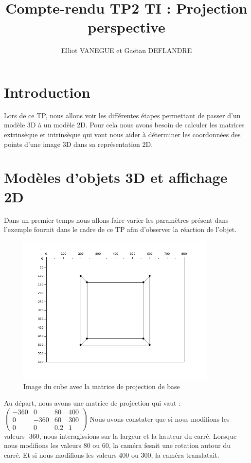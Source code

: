 \documentclass[a4paper,11pt]{article}
\title{Compte-rendu TP2 TI : Projection perspective}
\author{Elliot VANEGUE et Gaëtan DEFLANDRE}
\begin{document}


  \maketitle
  
  \mbox{}
  \newpage
  \clearpage
  
  \section*{Introduction}
  Lors de ce TP, nous allons voir les différentes étapes permettant de passer d'un
  modèle 3D à un modèle 2D. Pour cela nous avons besoin de calculer les matrices 
  extrinsèque et intrinsèque qui vont nous aider à déterminer les coordonnées des points
  d'une image 3D dans sa représentation 2D.
  
  \section{Modèles d'objets 3D et affichage 2D}
  Dans un premier temps nous allons faire varier les paramètres présent dans l'exemple fournit
  dans le cadre de ce TP afin d'observer la réaction de l'objet.\\
  
  \begin{figure}[H]
    \center
    \includegraphics[width=10cm]{Projection1.png}
    \caption{Image du cube avec la matrice de projection de base}
  \end{figure}

  
  Au départ, nous avons une matrice de projection qui vaut : 
  $\begin{pmatrix}
   -360 & 0 & 80 & 400 \\
   0 & -360 & 60 & 300 \\
   0 & 0 & 0.2 & 1
  \end{pmatrix}$
  Nous avons constater que si nous modifions les valeurs -360, nous interagissions sur la largeur
  et la hauteur du carré. Lorsque nous modifions les valeurs 80 ou 60, la caméra fesait une rotation
  autour du carré. Et si nous modifions les valeurs 400 ou 300, la caméra translatait.\\
  
\end{document}
